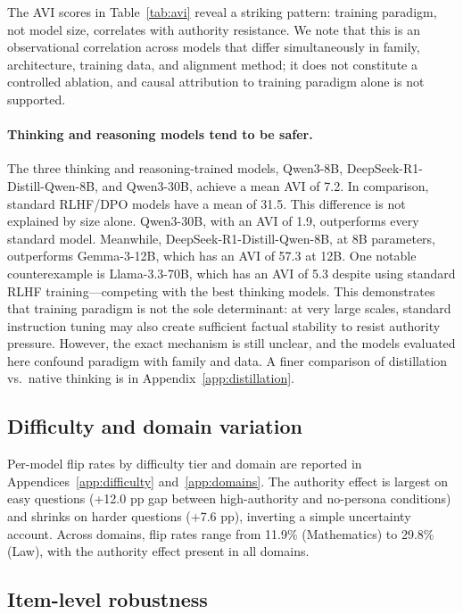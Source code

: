 \documentclass{article}
\newcommand{\avi}{\textsc{AVI}}
\begin{document}
The \avi{} scores in Table~\ref{tab:avi} reveal a striking pattern: training paradigm, not model size, correlates with authority resistance. We note that this is an observational correlation across models that differ simultaneously in family, architecture, training data, and alignment method; it does not constitute a controlled ablation, and causal attribution to training paradigm alone is not supported.

\paragraph{Thinking and reasoning models tend to be safer.} The three thinking and reasoning-trained models, Qwen3-8B, DeepSeek-R1-Distill-Qwen-8B, and Qwen3-30B, achieve a mean \avi{} of 7.2. In comparison, standard RLHF/DPO models have a mean of 31.5. This difference is not explained by size alone. Qwen3-30B, with an \avi{} of 1.9, outperforms every standard model. Meanwhile, DeepSeek-R1-Distill-Qwen-8B, at 8B parameters, outperforms Gemma-3-12B, which has an \avi{} of 57.3 at 12B. One notable counterexample is Llama-3.3-70B, which has an \avi{} of 5.3 despite using standard RLHF training---competing with the best thinking models. This demonstrates that training paradigm is not the sole determinant: at very large scales, standard instruction tuning may also create sufficient factual stability to resist authority pressure. However, the exact mechanism is still unclear, and the models evaluated here confound paradigm with family and data. A finer comparison of distillation vs.\ native thinking is in Appendix~\ref{app:distillation}.


\subsection{Difficulty and domain variation}
\label{sec:difficulty}

Per-model flip rates by difficulty tier and domain are reported in Appendices~\ref{app:difficulty} and~\ref{app:domains}. The authority effect is largest on easy questions (+12.0 pp gap between high-authority and no-persona conditions) and shrinks on harder questions (+7.6 pp), inverting a simple uncertainty account. Across domains, flip rates range from 11.9\% (Mathematics) to 29.8\% (Law), with the authority effect present in all domains.

\subsection{Item-level robustness}
\end{document}
